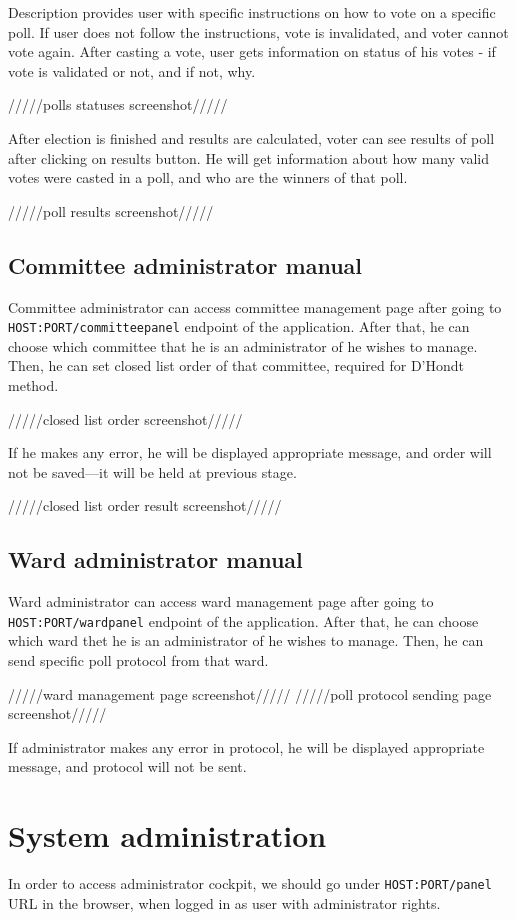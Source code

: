 \documentclass[a4paper,twoside,12pt]{book}
\begin{document}
      Description provides user with specific instructions on how to vote on a specific poll. If user does not follow the instructions, vote is invalidated, and voter cannot vote again.
      After casting a vote, user gets information on status of his votes - if vote is validated or not, and if not, why.

      /////polls statuses screenshot/////

      After election is finished and results are calculated, voter can see results of poll after clicking on results button.
      He will get information about how many valid votes were casted in a poll, and who are the winners of that poll.

      /////poll results screenshot/////

    \subsection{Committee administrator manual}
      Committee administrator can access committee management page after going to \lstinline|HOST:PORT/committeepanel| endpoint of the application.
      After that, he can choose which committee that he is an administrator of he wishes to manage.
      Then, he can set closed list order of that committee, required for D'Hondt method.

      /////closed list order screenshot/////

      If he makes any error, he will be displayed appropriate message, and order will not be saved---it will be held at previous stage.

      /////closed list order result screenshot/////

    \subsection{Ward administrator manual}
      Ward administrator can access ward management page after going to \lstinline|HOST:PORT/wardpanel| endpoint of the application.
      After that, he can choose which ward thet he is an administrator of he wishes to manage.
      Then, he can send specific poll protocol from that ward.

      /////ward management page screenshot/////
      /////poll protocol sending page screenshot/////

      If administrator makes any error in protocol, he will be displayed appropriate message, and protocol will not be sent.

  \section{System administration}
    In order to access administrator cockpit, we should go under \lstinline|HOST:PORT/panel| URL in the browser, when logged in as user with administrator rights.
\end{document}
